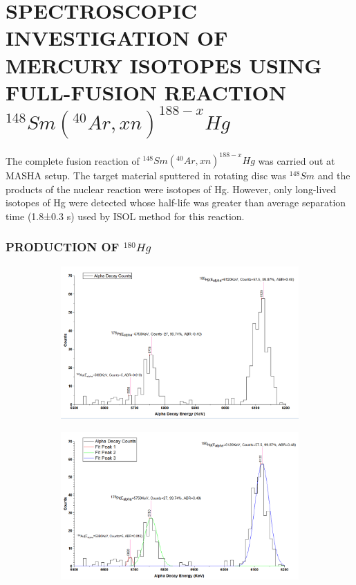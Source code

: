 \documentclass[12pt]{article}
\begin{document}
\section{SPECTROSCOPIC INVESTIGATION OF\\ MERCURY ISOTOPES USING FULL-FUSION REACTION $^{148}Sm(^{40}Ar,xn)^{188-x}Hg$}
The complete fusion reaction of $^{148}Sm(^{40}Ar,xn)^{188-x}Hg$ was carried out at MASHA setup. The target material sputtered in rotating disc was $^{148}Sm$ and the products of the nuclear reaction were isotopes of Hg. However, only long-lived isotopes of Hg were detected whose half-life was greater than average separation time (1.8±0.3 s) used by ISOL method for this reaction.


\clearpage

\subsubsection{PRODUCTION OF $^{180}Hg$}
\begin{figure}[h]
\centering
 \begin{subfigure}
\centering
\includegraphics[scale=0.5]{Hg180.png}
\end{subfigure}
\hfill
\begin{subfigure}
\centering
\includegraphics[scale=0.5]{Hg180(Peak Fitting).png}
\end{subfigure}
\label{First fig shows the alpha spectrum of Hg 180 and second fig shows the peak fitting for its prominent peaks.}
\end{figure}
\end{document}
